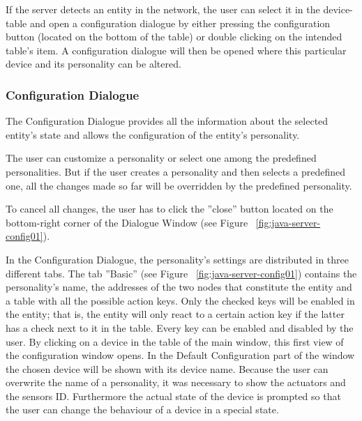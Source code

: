 If the server detects an entity in the network, the user can select it in the device-table and open a configuration dialogue by either pressing the configuration button (located on the bottom of the table) or double clicking on the intended table's item. A configuration dialogue will then be opened where this particular device and its personality can be altered.

\subsubsection{Configuration Dialogue}

The Configuration Dialogue provides all the information about the selected entity's state and allows the configuration of the entity's personality. 

The user can customize a personality or select one among the predefined personalities. But if the user creates a personality and then selects a predefined one, all the changes made so far will be overridden by the predefined personality. 

To cancel all changes, the user has to click the ''close'' button located on the bottom-right corner of the Dialogue Window (see Figure ~\ref{fig:java-server-config01}).   

In the Configuration Dialogue, the personality's settings are distributed in three different tabs. The tab ''Basic'' (see Figure ~\ref{fig:java-server-config01}) contains the personality's name, the addresses of the two nodes that constitute the entity and a table with all the possible action keys. Only the checked keys will be enabled in the entity; that is, the entity will only react to a certain action key if the latter has a check next to it in the table. Every key can be enabled and disabled by the user. 
\newline
By clicking on a device in the table of the main window, this first view of the configuration window opens. In the Default Configuration part of the window the chosen device will be shown with its device name. Because the user can overwrite the name of a personality, it was necessary to show the actuators and the sensors ID.\newline
Furthermore the actual state of the device is prompted so that the user can change the behaviour of a device in a special state. \newline
\newline

